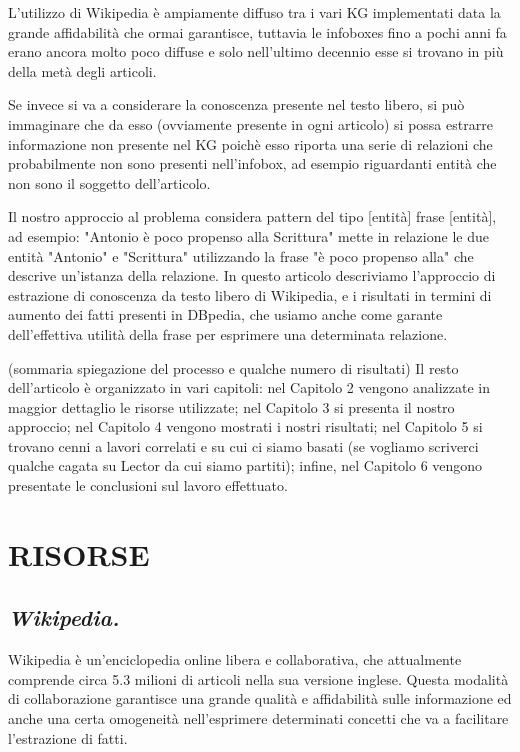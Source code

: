 \documentclass[10pt,a4paper,twocolumn]{article}
\begin{document}
L'utilizzo di Wikipedia è ampiamente diffuso tra i vari KG implementati data la grande affidabilità che ormai garantisce, tuttavia le infoboxes fino a pochi anni fa erano ancora molto poco diffuse e solo nell'ultimo decennio esse si trovano in più della metà degli articoli.

Se invece si va a considerare la conoscenza presente nel testo libero, si può immaginare che da esso (ovviamente presente in ogni articolo) si possa estrarre informazione non presente nel KG poichè esso riporta una serie di relazioni che probabilmente non sono presenti nell'infobox, ad esempio riguardanti entità che non sono il soggetto dell'articolo.

Il nostro approccio al problema considera pattern del tipo [entità] frase [entità], ad esempio: "Antonio è poco propenso alla Scrittura" mette in relazione le due entità "Antonio" e "Scrittura" utilizzando la frase "è poco propenso alla" che descrive un'istanza della relazione.
In questo articolo descriviamo l'approccio di estrazione di conoscenza da testo libero di Wikipedia, e i risultati in termini di aumento dei fatti presenti in DBpedia, che usiamo anche come garante dell'effettiva utilità della frase per esprimere una determinata relazione.

(sommaria spiegazione del processo e qualche numero di risultati)
Il resto dell'articolo è organizzato in vari capitoli: nel Capitolo 2 vengono analizzate in maggior dettaglio le risorse utilizzate; nel Capitolo 3 si presenta il nostro approccio; nel Capitolo 4 vengono mostrati i nostri risultati; nel Capitolo 5 si trovano cenni a lavori correlati e su cui ci siamo basati (se vogliamo scriverci qualche cagata su Lector da cui siamo partiti); infine, nel Capitolo 6 vengono presentate le conclusioni sul lavoro effettuato.

\section{RISORSE}
\subsection*{\textit{Wikipedia.}}

Wikipedia è un'enciclopedia online libera e collaborativa, che attualmente comprende circa 5.3 milioni di articoli nella sua versione inglese. Questa modalità di collaborazione garantisce una grande qualità e affidabilità sulle informazione ed anche una certa omogeneità nell'esprimere determinati concetti che va a facilitare l'estrazione di fatti.
 
\end{document}
